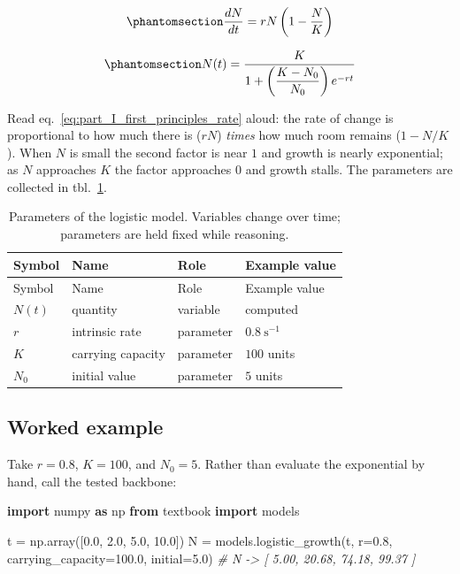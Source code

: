 \documentclass[
]{article}
\newenvironment{Shaded}{}{}
\newcommand{\CommentTok}[1]{\textcolor[rgb]{0.38,0.63,0.69}{\textit{#1}}}
\newcommand{\FloatTok}[1]{\textcolor[rgb]{0.25,0.63,0.44}{#1}}
\newcommand{\ImportTok}[1]{\textcolor[rgb]{0.00,0.50,0.00}{\textbf{#1}}}
\newcommand{\NormalTok}[1]{#1}
\newcommand{\OperatorTok}[1]{\textcolor[rgb]{0.40,0.40,0.40}{#1}}
\theoremstyle{plain}
\theoremstyle{definition}
\begin{document}
\begin{equation}\protect\phantomsection\label{eq:part_I_first_principles_rate}{ \frac{dN}{dt} = rN\left(1 - \frac{N}{K}\right) }\end{equation}

\begin{equation}\protect\phantomsection\label{eq:part_I_first_principles_model}{ N(t) = \frac{K}{1 + \left(\dfrac{K - N_0}{N_0}\right) e^{-rt}} }\end{equation}

Read eq.~\ref{eq:part_I_first_principles_rate} aloud: the rate of change
is proportional to how much there is (\(rN\)) \emph{times} how much room
remains (\(1 - N/K\)). When \(N\) is small the second factor is near
\(1\) and growth is nearly exponential; as \(N\) approaches \(K\) the
factor approaches \(0\) and growth stalls. The parameters are collected
in tbl.~\ref{tbl:part_I_first_principles_parameters}.

\begin{longtable}[]{@{}llll@{}}
\caption{Parameters of the logistic model. Variables change over time;
parameters are held fixed while
reasoning.}\label{tbl:part_I_first_principles_parameters}\tabularnewline
\toprule\noalign{}
Symbol & Name & Role & Example value \\
\midrule\noalign{}
\endfirsthead
\toprule\noalign{}
Symbol & Name & Role & Example value \\
\midrule\noalign{}
\endhead
\bottomrule\noalign{}
\endlastfoot
\(N(t)\) & quantity & variable & computed \\
\(r\) & intrinsic rate & parameter & \(0.8\ \mathrm{s^{-1}}\) \\
\(K\) & carrying capacity & parameter & \(100\) units \\
\(N_0\) & initial value & parameter & \(5\) units \\
\end{longtable}

\subsection{Worked example}\label{worked-example}

Take \(r = 0.8\), \(K = 100\), and \(N_0 = 5\). Rather than evaluate the
exponential by hand, call the tested backbone:

\begin{Shaded}
\begin{Highlighting}[]
\ImportTok{import}\NormalTok{ numpy }\ImportTok{as}\NormalTok{ np}
\ImportTok{from}\NormalTok{ textbook }\ImportTok{import}\NormalTok{ models}

\NormalTok{t }\OperatorTok{=}\NormalTok{ np.array([}\FloatTok{0.0}\NormalTok{, }\FloatTok{2.0}\NormalTok{, }\FloatTok{5.0}\NormalTok{, }\FloatTok{10.0}\NormalTok{])}
\NormalTok{N }\OperatorTok{=}\NormalTok{ models.logistic\_growth(t, r}\OperatorTok{=}\FloatTok{0.8}\NormalTok{, carrying\_capacity}\OperatorTok{=}\FloatTok{100.0}\NormalTok{, initial}\OperatorTok{=}\FloatTok{5.0}\NormalTok{)}
\CommentTok{\# N {-}\textgreater{} [ 5.00, 20.68, 74.18, 99.37 ]}
\end{Highlighting}
\end{Shaded}
\end{document}
